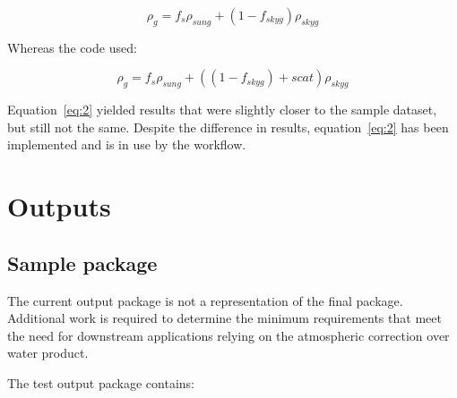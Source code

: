 \documentclass[a4paper]{article}
\begin{document}
    \begin{equation} \label{eq:1}
      \rho_{g} = f_{s}\rho_{sung} + (1 - f_{skyg})\rho_{skyg}
    \end{equation}

     \begin{flushleft}
      Whereas the code used:
    \end{flushleft}

    \begin{equation} \label{eq:2}
      \rho_{g} = f_{s}\rho_{sung} + ((1 - f_{skyg})+scat)\rho_{skyg}
    \end{equation}

    \begin{flushleft}
      Equation~\ref{eq:2} yielded results that were slightly closer to the sample dataset, but still not the same. Despite the difference in results, equation~\ref{eq:2} has been implemented and is in use by the workflow.
    \end{flushleft}

  \section{Outputs}

    \subsection{Sample package}

    \begin{flushleft}
      The current output package is not a representation of the final package. Additional work is required to determine the minimum requirements that meet the need for downstream applications relying on the atmospheric correction over water product. \par
      The test output package contains:
    \end{flushleft}
\end{document}
